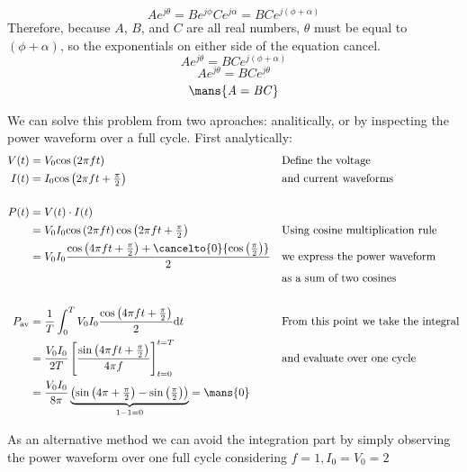\[ A e^{j\theta} = B e^{j\phi}C e^{j\alpha} = BC e^{j\left(\phi + \alpha\right)}\]
Therefore, because $A$, $B$, and $C$ are all real numbers, $\theta$ must be equal to $(\phi + \alpha)$, so the exponentials on either side of the equation cancel.
\[A e^{j\theta} =  BC e^{j\left(\phi + \alpha\right)}\]
\[A e^{j\theta} = BC e^{j\theta}\]
\[\mans{\textnormal{\textit{A}} = \textnormal{\textit{BC}}}\]

We can solve this problem from two aproaches: analitically, or by inspecting the
power waveform over a full cycle. First analytically:\bigskip
\begin{align*}
    V(t)&=V_0\mathrm{cos}\left(2\pi f t\right)&& \text{Define the voltage}\\
    I(t)&=I_0\mathrm{cos}\left(2\pi f t + \tfrac{\pi}{2}\right)&&\text{and current waveforms}\\
    \\
    P(t)&=V(t)\cdot I(t)\\
    &=V_0I_0\mathrm{cos}\left(2\pi f t\right)\mathrm{cos}\left(2\pi f t + \tfrac{\pi}{2}\right)&&\text{Using cosine multiplication rule}\\
        &=V_0I_0\frac{\mathrm{cos}\left(4\pi f t + \tfrac{\pi}{2}\right)+\cancelto{0}{\mathrm{cos}\left(\tfrac{\pi}{2}\right)}}{2}&&\text{we express the power waveform}\\
  & &&\text{as a sum of two cosines}\\
    \\
    P_{\mathrm{av}}&=\frac{1}{T}\int_0^TV_0I_0\frac{\mathrm{cos}\left(4\pi f t + \tfrac{\pi}{2}\right)}{2}\mathrm{d}t&&\text{From this point we take the integral}\\
    &=\frac{V_0I_0}{2T}\left[\frac{\mathrm{sin}\left(4\pi f t+ \tfrac{\pi}{2}\right)}{4\pi f}\right]_{t=0}^{t=T}&& \text{and evaluate over one cycle}\\
    &=\frac{V_0I_0}{8\pi}\underbrace{\left(\mathrm{sin}\left(4\pi+\tfrac{\pi}{2}\right)-\mathrm{sin}\left(\tfrac{\pi}{2}\right)\right)}_{1-1=0}=\mans{0}
\end{align*}

As an alternative method we can avoid the integration part by simply observing
the power waveform over one full cycle considering $f=1, I_0=V_0=2$

